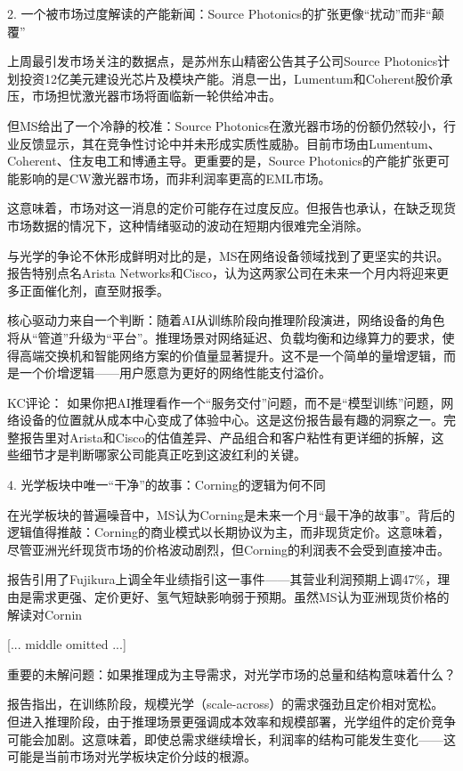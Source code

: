 \documentclass[11pt]{ctexart}
\begin{document}
2. 一个被市场过度解读的产能新闻：Source Photonics的扩张更像“扰动”而非“颠覆”

上周最引发市场关注的数据点，是苏州东山精密公告其子公司Source Photonics计划投资12亿美元建设光芯片及模块产能。消息一出，Lumentum和Coherent股价承压，市场担忧激光器市场将面临新一轮供给冲击。

但MS给出了一个冷静的校准：Source Photonics在激光器市场的份额仍然较小，行业反馈显示，其在竞争性讨论中并未形成实质性威胁。目前市场由Lumentum、Coherent、住友电工和博通主导。更重要的是，Source Photonics的产能扩张更可能影响的是CW激光器市场，而非利润率更高的EML市场。

这意味着，市场对这一消息的定价可能存在过度反应。但报告也承认，在缺乏现货市场数据的情况下，这种情绪驱动的波动在短期内很难完全消除。

与光学的争论不休形成鲜明对比的是，MS在网络设备领域找到了更坚实的共识。报告特别点名Arista Networks和Cisco，认为这两家公司在未来一个月内将迎来更多正面催化剂，直至财报季。

核心驱动力来自一个判断：随着AI从训练阶段向推理阶段演进，网络设备的角色将从“管道”升级为“平台”。推理场景对网络延迟、负载均衡和边缘算力的要求，使得高端交换机和智能网络方案的价值量显著提升。这不是一个简单的量增逻辑，而是一个价增逻辑——用户愿意为更好的网络性能支付溢价。

KC评论： 如果你把AI推理看作一个“服务交付”问题，而不是“模型训练”问题，网络设备的位置就从成本中心变成了体验中心。这是这份报告最有趣的洞察之一。完整报告里对Arista和Cisco的估值差异、产品组合和客户粘性有更详细的拆解，这些细节才是判断哪家公司能真正吃到这波红利的关键。

4. 光学板块中唯一“干净”的故事：Corning的逻辑为何不同

在光学板块的普遍噪音中，MS认为Corning是未来一个月“最干净的故事”。背后的逻辑值得推敲：Corning的商业模式以长期协议为主，而非现货定价。这意味着，尽管亚洲光纤现货市场的价格波动剧烈，但Corning的利润表不会受到直接冲击。

报告引用了Fujikura上调全年业绩指引这一事件——其营业利润预期上调47\%，理由是需求更强、定价更好、氢气短缺影响弱于预期。虽然MS认为亚洲现货价格的解读对Cornin

[... middle omitted ...]

重要的未解问题：如果推理成为主导需求，对光学市场的总量和结构意味着什么？

报告指出，在训练阶段，规模光学（scale-across）的需求强劲且定价相对宽松。但进入推理阶段，由于推理场景更强调成本效率和规模部署，光学组件的定价竞争可能会加剧。这意味着，即使总需求继续增长，利润率的结构可能发生变化——这可能是当前市场对光学板块定价分歧的根源。
\end{document}
